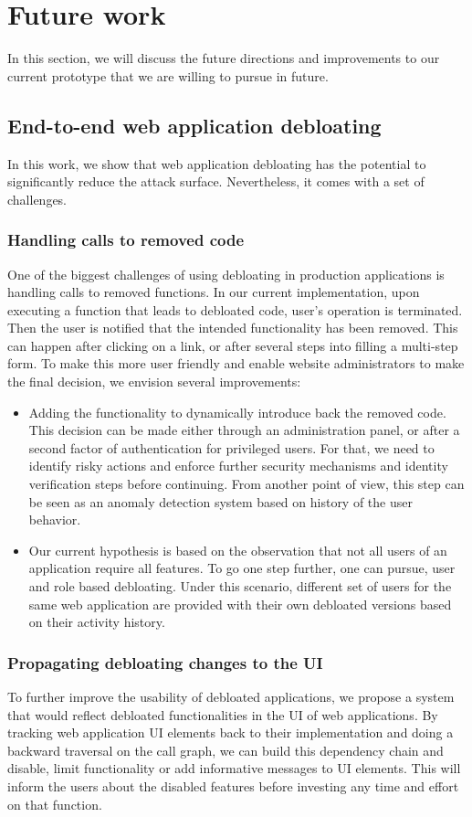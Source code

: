 \section{Future work}
In this section, we will discuss the future directions and improvements to our current prototype that we are willing to pursue in future.

\subsection{End-to-end web application debloating}
In this work, we show that web application debloating has the potential to significantly reduce the attack surface. Nevertheless, it comes with a set of challenges.

\subsubsection{Handling calls to removed code}
One of the biggest challenges of using debloating in production applications is handling calls to removed functions. In our current implementation, upon executing a function that leads to debloated code, user's operation is terminated. Then the user is notified that the intended functionality has been removed. This can happen after clicking on a link, or after several steps into filling a multi-step form. To make this more user friendly and enable website administrators to make the final decision, we envision several improvements:
\begin{itemize}
  \item Adding the functionality to dynamically introduce back the removed code. This decision can be made either through an administration panel, or after a second factor of authentication for privileged users. For that, we need to identify risky actions and
  enforce further security mechanisms and identity verification steps before continuing. From another point of view, this step can be seen as an anomaly detection system based on history of the user behavior.
  \item Our current hypothesis is based on the observation that not all users of an application require all features. To go one step further, one can pursue, user and role based debloating. Under this scenario, different set of users for the same web application are provided with their own debloated versions based on their activity history.
\end{itemize}

\subsubsection{Propagating debloating changes to the UI}
To further improve the usability of debloated applications, we propose a system that would reflect debloated functionalities in the UI of web applications. By tracking web application UI elements back to their implementation and doing a backward traversal on the call graph, we can build this dependency chain and disable, limit functionality or add informative messages to UI elements. This will inform the users about the disabled features before investing any time and effort on that function.

